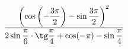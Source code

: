 \begin{ex}[type=calculate_expression]
	\begin{condition}
		\( \dfrac{\left( \cos\left( -\dfrac{3\pi}{2} \right)-\sin\dfrac{3\pi}{2} \right)^2}{2\sin\dfrac{\pi}{6}\cdot\tg\dfrac{\pi}{4}+\cos(-\pi)-\sin\dfrac{\pi}{4}} \)
	\end{condition}
\end{ex}